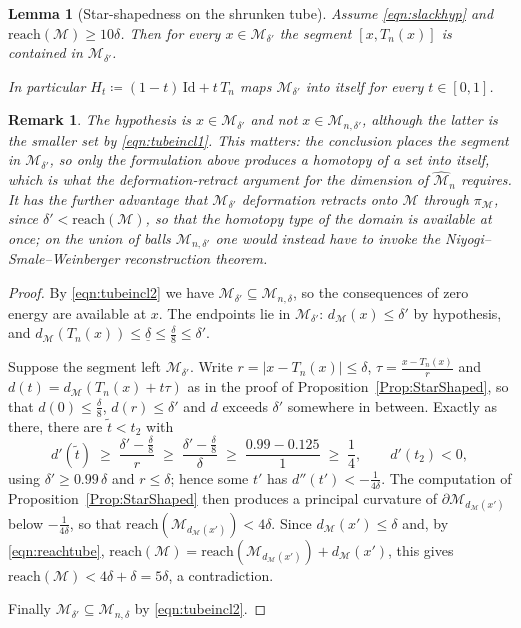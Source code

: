 \documentclass[11pt]{amsart}%
\theoremstyle{plain}
\newtheorem{remark}[definition]{Remark}
\newtheorem{lemma}[definition]{Lemma}
\newcommand{\1}{\mathbf{1}}
\newcommand{\M}{\mathcal{M}}
\begin{document}
\begin{lemma}[Star-shapedness on the shrunken tube]
    \label{Lem:StarShapedDiscrete}
    Assume \eqref{eqn:slackhyp} and $\mathrm{reach}(\M)\ge 10\delta$. Then for every
    $x\in \M_{\delta'}$ the segment $[x,T_n(x)]$ is contained in $\M_{\delta'}$.

    In particular $H_t\coloneqq(1-t)\,\mathrm{Id}+t\,T_n$ maps $\M_{\delta'}$ into itself for every
    $t\in[0,1]$.
\end{lemma}

\begin{remark}
    The hypothesis is $x\in \M_{\delta'}$ and \emph{not} $x\in\M_{n,\delta'}$, although the latter
    is the smaller set by \eqref{eqn:tubeincl1}. This matters: the conclusion places the segment in
    $\M_{\delta'}$, so only the formulation above produces a homotopy of a set into itself, which is
    what the deformation-retract argument for the dimension of $\widehat{\M}_n$ requires. It has
    the further advantage that $\M_{\delta'}$ deformation retracts onto $\M$ through $\pi_\M$, since
    $\delta'<\mathrm{reach}(\M)$, so that the homotopy type of the domain is available at once; on
    the union of balls $\M_{n,\delta'}$ one would instead have to invoke the
    Niyogi--Smale--Weinberger reconstruction theorem.
\end{remark}

\begin{proof}
    By \eqref{eqn:tubeincl2} we have $\M_{\delta'}\subseteq\M_{n,\delta}$, so the consequences of
    zero energy are available at $x$. The endpoints lie in $\M_{\delta'}$: $d_\M(x)\le\delta'$ by
    hypothesis, and $d_\M(T_n(x))\le\underline\delta\le\frac{\delta}{8}\le\delta'$.

    Suppose the segment left $\M_{\delta'}$. Write $r=|x-T_n(x)|\le\delta$,
    $\tau=\frac{x-T_n(x)}{r}$ and $d(t)=d_\M(T_n(x)+t\tau)$ as in the proof of
    Proposition~\ref{Prop:StarShaped}, so that $d(0)\le\frac{\delta}{8}$, $d(r)\le\delta'$ and $d$ exceeds
    $\delta'$ somewhere in between. Exactly as there, there are $\widetilde t<t_2$ with
    \[
        d'(\widetilde t)\;\ge\;\frac{\delta'-\frac{\delta}{8}}{r}\;\ge\;\frac{\delta'-\frac{\delta}{8}}{\delta}
        \;\ge\;\frac{0.99-0.125}{1}\;\ge\;\frac14 ,
        \qquad d'(t_2)<0,
    \]
    using $\delta'\ge0.99\,\delta$ and $r\le\delta$; hence some $t'$ has
    $d''(t')<-\tfrac{1}{4\delta}$. The computation of Proposition~\ref{Prop:StarShaped} then
    produces a principal curvature of $\partial \M_{d_\M(x')}$ below $-\tfrac{1}{4\delta}$, so that
    $\mathrm{reach}(\M_{d_\M(x')})<4\delta$. Since $d_\M(x')\le\delta$ and, by
    \eqref{eqn:reachtube}, $\mathrm{reach}(\M)=\mathrm{reach}(\M_{d_\M(x')})+d_\M(x')$, this gives
    $\mathrm{reach}(\M)<4\delta+\delta=5\delta$, a contradiction.

    Finally $\M_{\delta'}\subseteq \M_{n,\delta}$ by \eqref{eqn:tubeincl2}.
\end{proof}
\end{document}
